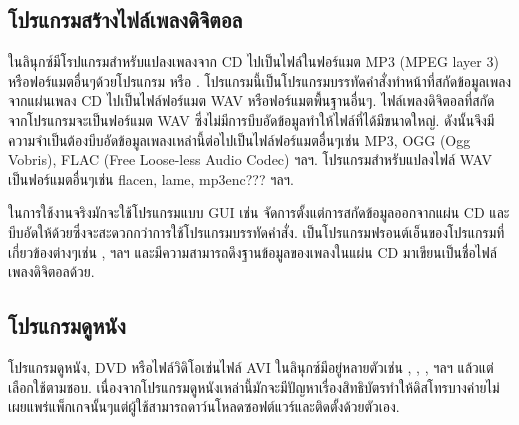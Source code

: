 \begin{thwbr}
\begin{figure}[!hbt]
\end{figure}

\begin{figure}[!hbt]
\end{figure}



\subsection{โปรแกรมสร้างไฟล์เพลงดิจิตอล}
ในลินุกซ์มีโรปแกรมสำหรับแปลงเพลงจาก CD ไปเป็นไฟล์ในฟอร์แมต MP3 (MPEG layer 3) หรือฟอร์แมตอื่นๆด้วยโปรแกรม  หรือ . โปรแกรมนี้เป็นโปรแกรมบรรทัดคำสั่งทำหน้าที่สกัดข้อมูลเพลงจากแผ่นเพลง CD ไปเป็นไฟล์ฟอร์แมต WAV หรือฟอร์แมตพื้นฐานอื่นๆ. ไฟล์เพลงดิจิตอลที่สกัดจากโปรแกรมจะเป็นฟอร์แมต WAV ซึ่งไม่มีการบีบอัดข้อมูลทำให้ไฟล์ที่ได้มีขนาดใหญ่.  ดังนั้นจึงมีความจำเป็นต้องบีบอัดข้อมูลเพลงเหล่านี้ต่อไปเป็นไฟล์ฟอร์แมตอื่นๆเช่น MP3, OGG (Ogg Vobris), FLAC (Free Loose-less Audio Codec) ฯลฯ. โปรแกรมสำหรับแปลงไฟล์ WAV เป็นฟอร์แมตอื่นๆเช่น flacen, lame, mp3enc??? ฯลฯ. 


ในการใช้งานจริงมักจะใช้โปรแกรมแบบ GUI เช่น  จัดการตั้งแต่การสกัดข้อมูลออกจากแผ่น CD และบีบอัดให้ด้วยซึ่งจะสะดวกกว่าการใช้โปรแกรมบรรทัดคำสั่ง.  เป็นโปรแกรมฟรอนต์เอ็นของโปรแกรมที่เกี่ยวข้องต่างๆเช่น ,  ฯลฯ และมีความสามารถดึงฐานข้อมูลของเพลงในแผ่น CD มาเขียนเป็นชื่อไฟล์เพลงดิจิตอลด้วย. 


\subsection{โปรแกรมดูหนัง}
โปรแกรมดูหนัง, DVD หรือไฟล์วิดิโอเช่นไฟล์ AVI ในลินุกซ์มีอยู่หลายตัวเช่น , , ,  ฯลฯ แล้วแต่เลือกใช้ตามชอบ. เนื่องจากโปรแกรมดูหนังเหล่านี้มักจะมีปัญหาเรื่องสิทธิบัตรทำให้ดิสโทรบางค่ายไม่เผยแพร่แพ็กเกจนั้นๆแต่ผู้ใช้สามารถดาว์นโหลดซอฟต์แวร์และติดตั้งด้วยตัวเอง.  

\begin{figure}[!hbt]
\end{figure}



\end{thwbr}
